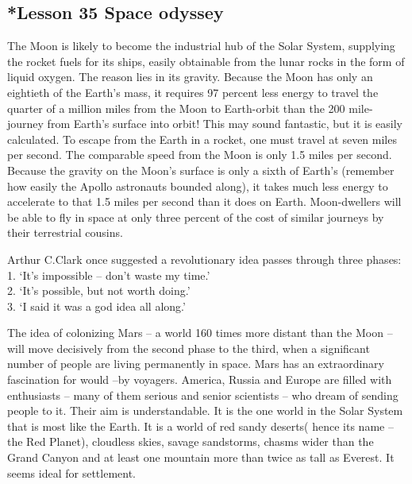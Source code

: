 \documentclass[kindlepaper]{BHCexam4kindle}
\begin{document}
\subsection{*Lesson 35 Space odyssey}
\par
The Moon is likely to become the industrial hub of the Solar System, supplying the rocket fuels for its ships,
easily obtainable from the lunar rocks in the form of liquid oxygen. The reason lies in its gravity. Because the
Moon has only an eightieth of the Earth's mass, it requires 97 percent less energy to travel the quarter of a
million miles from the Moon to Earth-orbit than the 200 mile-journey from Earth's surface into orbit!
This may sound fantastic, but it is easily calculated. To escape from the Earth in a rocket, one must travel
at seven miles per second. The comparable speed from the Moon is only 1.5 miles per second. Because the
gravity on the Moon's surface is only a sixth of Earth's (remember how easily the Apollo astronauts bounded
along), it takes much less energy to accelerate to that 1.5 miles per second than it does on Earth.
Moon-dwellers will be able to fly in space at only three percent of the cost of similar journeys by their
terrestrial cousins.
\par
Arthur C.Clark once suggested a revolutionary idea passes through three phases:
\\1. ‘It's impossible – don't waste my time.'
\\2. ‘It's possible, but not worth doing.'
\\3. ‘I said it was a god idea all along.'
\par
The idea of colonizing Mars – a world 160 times more distant than the Moon – will move decisively from
the second phase to the third, when a significant number of people are living permanently in space. Mars
has an extraordinary fascination for would –by voyagers. America, Russia and Europe are filled with
enthusiasts – many of them serious and senior scientists – who dream of sending people to it. Their aim is
understandable. It is the one world in the Solar System that is most like the Earth. It is a world of red
sandy deserts( hence its name – the Red Planet), cloudless skies, savage sandstorms, chasms wider than
the Grand Canyon and at least one mountain more than twice as tall as Everest. It seems ideal for
settlement.
\clearpage
\end{document}
